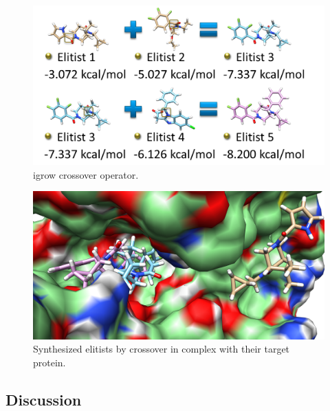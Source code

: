 \begin{figure}
\centering
\includegraphics[width=\textwidth]{igrow/Crossover.png}
\caption{igrow crossover operator.}
\label{igrow:Crossover}
\end{figure}

\begin{figure}
\centering
\includegraphics[width=\textwidth]{igrow/CrossoverComplex.png}
\caption{Synthesized elitists by crossover in complex with their target protein.}
\label{igrow:CrossoverComplex}
\end{figure}

\subsection{Discussion}

